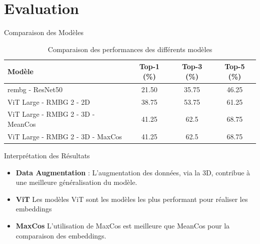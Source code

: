 \documentclass{beamer}
\begin{document}
\section{Evaluation}
\begin{frame}{Comparaison des Modèles}
    \begin{center}
        \begin{table}[]
            \centering
            \scriptsize %
            \begin{tabular}{|l|c|c|c|}
                \hline
                \textbf{Modèle} & \textbf{Top-1 (\%)} & \textbf{Top-3 (\%)} & \textbf{Top-5 (\%)} \\
                \hline
                rembg - ResNet50 & 21.50 & 35.75 & 46.25 \\
                \hline
                ViT Large - RMBG 2 - 2D & 38.75 & 53.75 & 61.25 \\
                \hline
                ViT Large - RMBG 2 - 3D - MeanCos & 41.25 & 62.5 & 68.75 \\
                \hline
                ViT Large - RMBG 2 - 3D - MaxCos & 41.25 & 62.5 & 68.75 \\
                \hline
            \end{tabular}
            \caption{Comparaison des performances des différents modèles}
        \end{table}
    \end{center}
    
    \begin{block}{Interprétation des Résultats}
        \begin{itemize}
            \item \textbf{Data Augmentation} : L'augmentation des données, via la 3D, contribue à une meilleure généralisation du modèle.
            \item \textbf{ViT} Les modèles ViT sont les modèles les plus performant pour réaliser les embeddings
            \item \textbf{MaxCos} L'utilisation de MaxCos est meilleure que MeanCos pour la comparaison des embeddings.
        \end{itemize}
    \end{block}
\end{frame}
\end{document}
